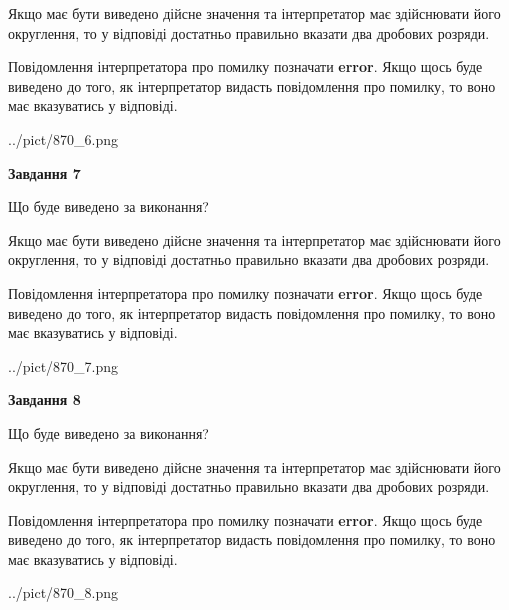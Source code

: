 \documentclass[12pt, ukrainian]{article}
\begin{document}
{\begin {Large}
Якщо має бути виведено дійсне значення та інтерпретатор має здійснювати його округлення, 
то у відповіді достатньо правильно вказати два дробових розряди.

Повідомлення інтерпретатора про помилку позначати \textbf{error}.
Якщо щось буде виведено до того, як інтерпретатор видасть повідомлення про помилку, 
то воно має вказуватись у відповіді. \par

\begin{center}
	{../pict/870_6.png}
\end{center}
\newpage

{\begin {center}\textbf{Завдання 7}\end {center}}\par
Що буде виведено за виконання? \par

Якщо має бути виведено дійсне значення та інтерпретатор має здійснювати його округлення, 
то у відповіді достатньо правильно вказати два дробових розряди.

Повідомлення інтерпретатора про помилку позначати \textbf{error}.
Якщо щось буде виведено до того, як інтерпретатор видасть повідомлення про помилку, 
то воно має вказуватись у відповіді. \par

\begin{center}
	{../pict/870_7.png}
\end{center}
\newpage

{\begin {center}\textbf{Завдання 8}\end {center}}\par
Що буде виведено за виконання? \par

Якщо має бути виведено дійсне значення та інтерпретатор має здійснювати його округлення, 
то у відповіді достатньо правильно вказати два дробових розряди.

Повідомлення інтерпретатора про помилку позначати \textbf{error}.
Якщо щось буде виведено до того, як інтерпретатор видасть повідомлення про помилку, 
то воно має вказуватись у відповіді. \par

\begin{center}
	{../pict/870_8.png}
\end{center}
\newpage


\end{Large}}
\end{document}
